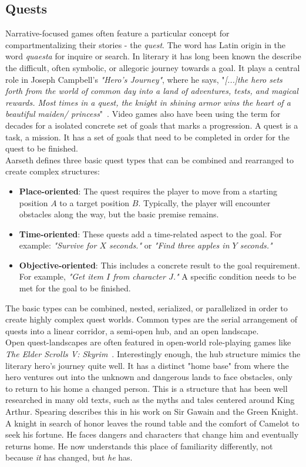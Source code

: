 \subsection{Quests}
Narrative-focused games often feature a particular concept for compartmentalizing their stories - the \textit{quest}. The word has Latin origin in the word \textit{quaesta} for inquire or search. In literary it has long been known the describe the difficult, often symbolic, or allegoric journey towards a goal. It plays a central role in Joseph Campbell's \textit{"Hero's Journey"}, where he says, "\textit{[...]the hero sets forth from the world of common day into a land of adventures, tests, and magical rewards. Most times in a quest, the knight in shining armor wins the heart of a beautiful maiden/ princess}"~\cite{Campbell2008}. Video games also have been using the term for decades for a isolated concrete set of goals that marks a progression. A quest is a task, a mission. It has a set of goals that need to be completed in order for the quest to be finished.\\
Aarseth defines three basic quest types that can be combined and rearranged to create complex structures:
\begin{itemize}
	\item \textbf{Place-oriented}: The quest requires the player to move from a starting position $A$ to a target position $B$. Typically, the player will encounter obstacles along the way, but the basic premise remains.
	\item \textbf{Time-oriented}: These quests add a time-related aspect to the goal. For example: \textit{"Survive for $X$ seconds."} or \textit{"Find three apples in $Y$ seconds."}
	\item \textbf{Objective-oriented}: This includes a concrete result to the goal requirement. For example, \textit{"Get item $I$ from character $J$."} A specific condition needs to be met for the goal to be finished.
\end{itemize} 
The basic types can be combined, nested, serialized, or parallelized in order to create highly complex quest worlds. Common types are the serial arrangement of quests into a linear corridor, a semi-open hub, and an open landscape.~\cite{Aarseth2005}\\
Open quest-landscapes are often featured in open-world role-playing games like \textit{The Elder Scrolls V: Skyrim}~\cite{skyrim}. Interestingly enough, the hub structure mimics the literary hero's journey quite well. It has a distinct "home base" from where the hero ventures out into the unknown and dangerous lands to face obstacles, only to return to his home a changed person. This is a structure that has been well researched in many old texts, such as the myths and tales centered around King Arthur. Spearing describes this in his work on Sir Gawain and the Green Knight. A knight in search of honor leaves the round table and the comfort of Camelot to seek his fortune. He faces dangers and characters that change him and eventually returns home. He now understands this place of familiarity differently, not because \textit{it} has changed, but \textit{he} has.~\cite{Spearing1994}\\

